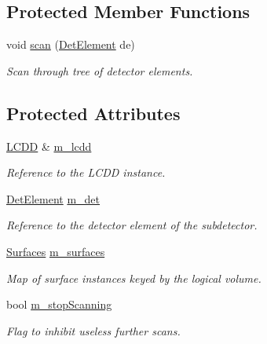\subsection*{Protected Member Functions}
\begin{DoxyCompactItemize}
\item 
void \hyperlink{class_d_d4hep_1_1_surface_installer_ade9e70ab94841f49b0c070e1c7a3e16a}{scan} (\hyperlink{class_d_d4hep_1_1_surface_installer_ab88f41bd9efd54b4b67baee892bfa926}{Det\+Element} de)
\begin{DoxyCompactList}\small\item\em Scan through tree of detector elements. \end{DoxyCompactList}\end{DoxyCompactItemize}
\subsection*{Protected Attributes}
\begin{DoxyCompactItemize}
\item 
\hyperlink{class_d_d4hep_1_1_surface_installer_a155d137884c31b56d13fb58846e562a3}{L\+C\+DD} \& \hyperlink{class_d_d4hep_1_1_surface_installer_a557d1f8fd057ae637f855dca603ebaf9}{m\+\_\+lcdd}
\begin{DoxyCompactList}\small\item\em Reference to the L\+C\+DD instance. \end{DoxyCompactList}\item 
\hyperlink{class_d_d4hep_1_1_surface_installer_ab88f41bd9efd54b4b67baee892bfa926}{Det\+Element} \hyperlink{class_d_d4hep_1_1_surface_installer_a8a8f3acac5b96cd94464d886e06bf6df}{m\+\_\+det}
\begin{DoxyCompactList}\small\item\em Reference to the detector element of the subdetector. \end{DoxyCompactList}\item 
\hyperlink{class_d_d4hep_1_1_surface_installer_a16346209b86955ff4a4a380c3ce1bcd2}{Surfaces} \hyperlink{class_d_d4hep_1_1_surface_installer_aa301ec142bb36afc171389e0e8acabd2}{m\+\_\+surfaces}
\begin{DoxyCompactList}\small\item\em Map of surface instances keyed by the logical volume. \end{DoxyCompactList}\item 
bool \hyperlink{class_d_d4hep_1_1_surface_installer_ab8193ffcef2d5b522aba8d594a2da412}{m\+\_\+stop\+Scanning}
\begin{DoxyCompactList}\small\item\em Flag to inhibit useless further scans. \end{DoxyCompactList}\end{DoxyCompactItemize}


